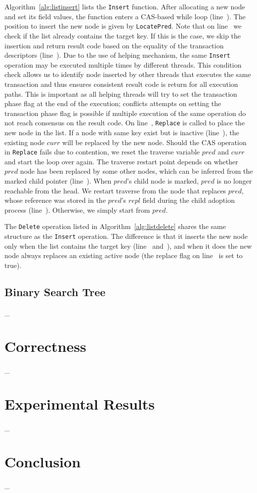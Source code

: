 \documentclass[10pt,conference,compsocconf]{IEEEtran}
\begin{document}
Algorithm~\ref{alg:listinsert} lists the \texttt{Insert} function.
After allocating a new node and set its field values, the function enters a CAS-based while loop (line~).
The position to insert the new node is given by \texttt{LocatePred}.
Note that on line~ we check if the list already contains the target key.
If this is the case, we skip the insertion and return result code based on the equality of the transaction descriptors (line~).
Due to the use of helping mechanism, the same \texttt{Insert} operation may be executed multiple times by different threads.
This condition check allows us to identify node inserted by other threads that executes the same transaction and thus ensures consistent result code is return for all execution paths.
This is important as all helping threads will try to set the transaction phase flag at the end of the execution; conflicts attempts on setting the transaction phase flag is possible if multiple execution of the same operation do not reach consensus on the result code.
On line~, \texttt{Replace} is called to place the new node in the list.
If a node with same key exist but is inactive (line~), the existing node $curr$ will be replaced by the new node.
Should the CAS operation in \texttt{Replace} fails due to contention, we reset the traverse variable $pred$ and $curr$ and start the loop over again.
The traverse restart point depends on whether $pred$ node has been replaced by some other nodes, which can be inferred from the marked child pointer (line~).
When $pred$'s child node is marked, $pred$ is no longer reachable from the head.
We restart traverse from the node that replaces $pred$, whose reference was stored in the $pred$'s $repl$ field during the child adoption process (line~).
Otherwise, we simply start from $pred$.

The \texttt{Delete} operation listed in Algorithm~\ref{alg:listdelete} shares the same structure as the \texttt{Insert} operation.
The difference is that it inserts the new node only when the list contains the target key (line~ and~), and when it does the new node always replaces an existing active node (the replace flag on line~ is set to true).

\subsection{Binary Search Tree}
\_

\section{Correctness}
\label{sec:correctness}
\_

\section{Experimental Results}
\label{sec:experiment}
\_

\section{Conclusion}
\label{sec:conclusion}
\_




\end{document}
